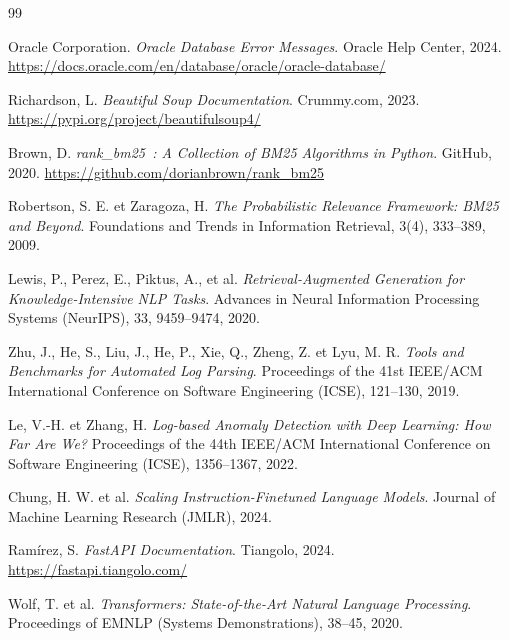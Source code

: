 \documentclass[12pt,a4paper]{report}
\begin{document}
\begin{thebibliography}{99}

Oracle Corporation.
\textit{Oracle Database Error Messages}.
Oracle Help Center, 2024.
\url{https://docs.oracle.com/en/database/oracle/oracle-database/}

Richardson, L.
\textit{Beautiful Soup Documentation}.
Crummy.com, 2023.
\url{https://pypi.org/project/beautifulsoup4/}

Brown, D.
\textit{rank\_bm25~: A Collection of BM25 Algorithms in Python}.
GitHub, 2020.
\url{https://github.com/dorianbrown/rank_bm25}

Robertson, S. E. et Zaragoza, H.
\textit{The Probabilistic Relevance Framework: BM25 and Beyond}.
Foundations and Trends in Information Retrieval, 3(4), 333--389, 2009.

Lewis, P., Perez, E., Piktus, A., et al.
\textit{Retrieval-Augmented Generation for Knowledge-Intensive NLP Tasks}.
Advances in Neural Information Processing Systems (NeurIPS), 33, 9459--9474, 2020.

Zhu, J., He, S., Liu, J., He, P., Xie, Q., Zheng, Z. et Lyu, M. R.
\textit{Tools and Benchmarks for Automated Log Parsing}.
Proceedings of the 41st IEEE/ACM International Conference on Software Engineering (ICSE), 121--130, 2019.

Le, V.-H. et Zhang, H.
\textit{Log-based Anomaly Detection with Deep Learning: How Far Are We?}
Proceedings of the 44th IEEE/ACM International Conference on Software Engineering (ICSE), 1356--1367, 2022.

Chung, H. W. et al.
\textit{Scaling Instruction-Finetuned Language Models}.
Journal of Machine Learning Research (JMLR), 2024.

Ram\'irez, S.
\textit{FastAPI Documentation}.
Tiangolo, 2024.
\url{https://fastapi.tiangolo.com/}

Wolf, T. et al.
\textit{Transformers: State-of-the-Art Natural Language Processing}.
Proceedings of EMNLP (Systems Demonstrations), 38--45, 2020.

\end{thebibliography}

\appendix
\end{document}
